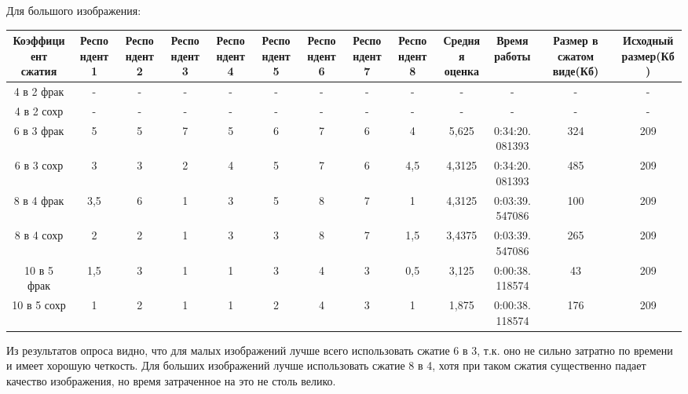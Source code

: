 \documentclass{article}
\begin{document}
Для большого изображения:

\begin{center}
	\begin{tabular}{||c c c c c c c c c c c c c||} 
		\hline
		Коэффициент сжатия & Респондент 1 & Респондент 2 & Респондент 3 & Респондент 4 & Респондент 5 & Респондент 6 & Респондент 7 & Респондент 8 & Средняя оценка & Время работы & Размер в сжатом виде(Кб) & Исходный размер(Кб) \\ [0.5ex] 
		\hline\hline
		4 в 2 фрак & - & - & - & - & - & - & - & - & - & - & - & - \\ 
		\hline
		4 в 2 сохр & - & - & - & - & - & - & - & - & - & - & - & - \\
		\hline
		6 в 3 фрак & 5 & 5 & 7 & 5 & 6 & 7 & 6 & 4 &	5,625 & 0:34:20.081393 & 324 &	209 \\
		\hline
		6 в 3 сохр & 3 & 3 & 2 & 4 & 5 & 7 & 6 & 4,5 &	4,3125 & 0:34:20.081393 & 485 &	209 \\
		\hline
		8 в 4 фрак & 3,5 &	6 &	1 &	3 &	5 &	8 &	7 &	1 &	4,3125 & 0:03:39.547086 & 100 &	209 \\ 
		\hline
		8 в 4 сохр & 2 & 2 & 1 & 3 & 3 & 8 & 7 & 1,5 &	3,4375 & 0:03:39.547086 & 265 &	209 \\ 
		\hline
		10 в 5 фрак & 1,5 & 3 &	1 &	1 &	3 &	4 &	3  & 0,5 &	3,125 &	0:00:38.118574 & 43 & 209 \\ 
		\hline
		10 в 5 сохр & 1 & 2 & 1 & 1 & 2 & 4 & 3 & 1 & 1,875 & 0:00:38.118574 & 176 & 209 \\ [1ex] 
		\hline
	\end{tabular}
\end{center}

Из результатов опроса видно, что для малых изображений лучше всего использовать сжатие 6 в 3, т.к. оно не сильно затратно по времени и имеет хорошую четкость. Для больших изображений лучше использовать сжатие 8 в 4, хотя при таком сжатия существенно падает качество изображения, но время затраченное на это не столь велико.

  
\end{document}
